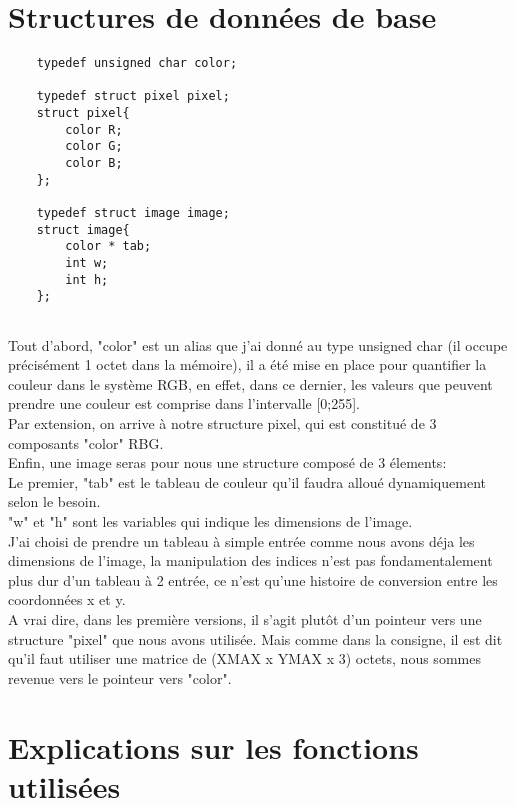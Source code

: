 \documentclass[12pt, letterpaper]{article}
\begin{document}
\section{Structures de données de base}
\begin{lstlisting}
    typedef unsigned char color;

    typedef struct pixel pixel;
    struct pixel{
        color R;
        color G;
        color B;
    };

    typedef struct image image;
    struct image{
        color * tab;
        int w;
        int h;
    };
        
\end{lstlisting}
Tout d'abord, "color" est un alias que j'ai donné au type unsigned char (il occupe précisément 1 octet dans la mémoire), il a été mise en place pour 
quantifier la couleur dans le système RGB, en effet, dans ce dernier, les valeurs que peuvent prendre
une couleur est comprise dans l'intervalle [0;255].\\
Par extension, on arrive à notre structure pixel, qui est constitué de 3 composants "color" RBG. \\
Enfin, une image seras pour nous une structure composé de 3 élements:\\
Le premier, "tab" est le tableau de couleur qu'il faudra alloué dynamiquement selon le besoin.\\
"w" et "h" sont les variables qui indique les dimensions de l'image.\\
J'ai choisi de prendre un tableau à simple entrée comme nous avons déja les dimensions de l'image, 
la manipulation des indices n'est pas fondamentalement plus dur d'un tableau à 2 entrée, ce n'est qu'une 
histoire de conversion entre les coordonnées x et y.\\
A vrai dire, dans les première versions, il s'agit plutôt d'un pointeur vers une structure "pixel" que nous avons utilisée.
Mais comme dans la consigne, il est dit qu'il faut utiliser une matrice de (XMAX x YMAX x 3) octets, nous sommes revenue vers le pointeur vers "color".

\section{Explications sur les fonctions utilisées}
\end{document}
